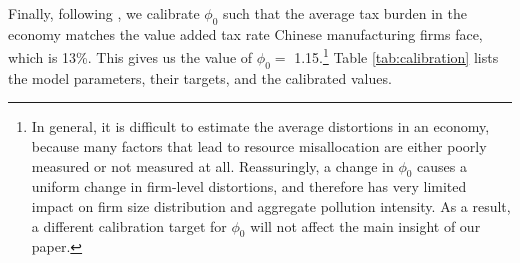 \documentclass[AEJ]{AEA}
\begin{document}
Finally, following \citet{BentoRestuccia:2016}, we calibrate $\phi_0$ such that the average tax burden in the economy matches the value added tax rate Chinese manufacturing firms face, which is 13\%. This gives us the value of $\phi_0 =$ 1.15.\footnote{In general, it is difficult to estimate the average distortions in an economy, because many factors that lead to resource misallocation are either poorly measured or not measured at all. Reassuringly, a change in $\phi_0$ causes a uniform change in firm-level distortions, and therefore has very limited impact on firm size distribution and aggregate pollution intensity. As a result, a different calibration target for $\phi_0$ will not affect the main insight of our paper.} Table \ref{tab:calibration} lists the model parameters, their targets, and the calibrated values.
\end{document}
